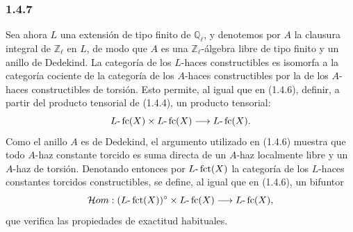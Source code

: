 \subsubsection*{1.4.7}
Sea ahora \(L\) una extensión de tipo finito de \(\mathbb Q_\ell\), y denotemos por \(A\) la clausura integral de \(\mathbb Z_\ell\) en \(L\), de modo que \(A\) es una \(\mathbb Z_\ell\)-álgebra libre de tipo finito y un anillo de Dedekind. La categoría de los \(L\)-haces constructibles es isomorfa a la categoría cociente de la categoría de los \(A\)-haces constructibles por la de los \(A\)-haces constructibles de torsión. Esto permite, al igual que en (1.4.6), definir, a partir del producto tensorial de (1.4.4), un producto tensorial:
\[
L\text{-}\operatorname{fc}(X)\times L\text{-}\operatorname{fc}(X)\longrightarrow L\text{-}\operatorname{fc}(X).
\]
Como el anillo \(A\) es de Dedekind, el argumento utilizado en (1.4.6) muestra que todo \(A\)-haz constante torcido es suma directa de un \(A\)-haz localmente libre y un \(A\)-haz de torsión. Denotando entonces por \(L\text{-}\operatorname{fct}(X)\) la categoría de los \(L\)-haces constantes torcidos constructibles, se define, al igual que en (1.4.6), un bifuntor
\[
\mathcal{H}om:(L\text{-}\operatorname{fct}(X))^\circ\times L\text{-}\operatorname{fc}(X)
\longrightarrow L\text{-}\operatorname{fc}(X),
\]
que verifica las propiedades de exactitud habituales.
